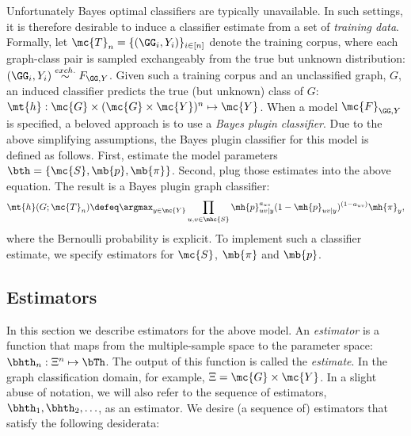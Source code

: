 \documentclass[10pt,journal,cspaper,compsoc]{IEEEtran}
\begin{document}
Unfortunately Bayes optimal classifiers are typically unavailable. In such settings, it is therefore desirable to induce a classifier estimate from a set of \emph{training data}. Formally, let $\mc{T}_n= \{(\GG_i,Y_i)\}_{i \in [n]}$ denote the training corpus, where each graph-class pair is sampled exchangeably from the true but unknown distribution: $(\GG_i,Y_i) \overset{exch.}{\sim} F_{\GG, Y}$.  Given such a training corpus and an unclassified graph, $G$, an induced classifier predicts the true (but unknown) class of $G$: $\mt{h}: \mc{G} \times (\mc{G} \times \mc{Y})^n \mapsto \mc{Y}$.  When a model $\mc{F}_{\GG,Y}$ is specified, a beloved approach is to use a  \emph{Bayes plugin classifier}. Due to the above simplifying assumptions, the Bayes plugin classifier for this model is defined as follows.  First, estimate the  model parameters $\bth=\{\mc{S}, \mb{p}, \mb{\pi}\}$. Second, plug those estimates into the above equation.  The result is a Bayes plugin graph classifier:
\begin{align}
\mt{h}(G; \mc{T}_n) \defeq  \argmax_{y \in \mc{Y}} \prod_{u,v \in \mhc{S}}
\mh{p}_{uv|y}^{a_{uv}}(1-\mh{p}_{uv|y})^{(1-a_{uv})} \mh{\pi}_y,
\end{align}
where the Bernoulli probability is explicit. To implement such a classifier estimate, we specify estimators for $\mc{S}$, $\mb{\pi}$ and $\mb{p}$.


\subsection{Estimators} %
\label{sub:estimators}


In this section we describe estimators for the above model.  An \emph{estimator} is a function that maps from the multiple-sample space to the parameter space: $\bhth_n: \Xi^n \mapsto \bTh$. The output of this function is called the \emph{estimate}.  In the graph classification domain, for example, $\Xi=\mc{G} \times \mc{Y}$.  In a slight abuse of notation, we will also refer to the sequence of estimators, $\bhth_1,\bhth_2, \ldots$, as an estimator.  We desire (a sequence of) estimators that satisfy the following desiderata:
\end{document}
